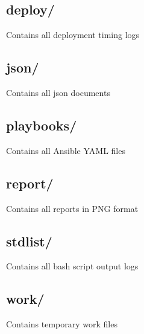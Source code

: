 \documentclass[9pt,twocolumn,twoside]{../../styles/osajnl}
\begin{document}
\subsection{deploy/} Contains all deployment timing logs
\subsection{json/} Contains all json documents
\subsection{playbooks/} Contains all Ansible YAML files 
\subsection{report/} Contains all reports in PNG format
\subsection{stdlist/} Contains all bash script output logs
\subsection{work/} Contains temporary work files
\end{document}
